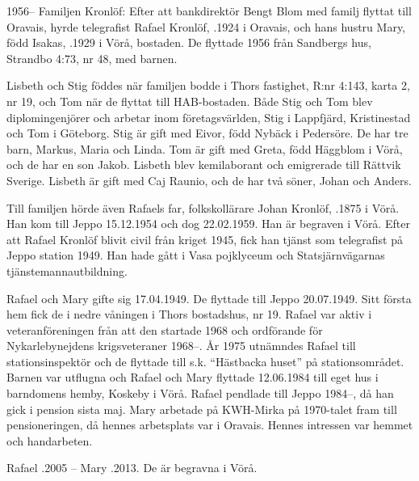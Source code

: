 1956--
Familjen Kronlöf:	Efter att bankdirektör Bengt Blom med familj flyttat till	Oravais, hyrde telegrafist Rafael Kronlöf, .1924 i Oravais, och hans hustru Mary, född Isakas, .1929 i Vörå, bostaden. De flyttade 1956 från Sandbergs hus, Strandbo 4:73, nr 48, med barnen.
\begin{jhchildren}
  \item {}
  \item {}
  \item {}
  \item {}
\end{jhchildren}
Lisbeth och Stig föddes när familjen bodde i Thors fastighet, R:nr 4:143, karta 2, nr 19, och Tom när de flyttat till HAB-bostaden. Både Stig och Tom blev diplomingenjörer och	arbetar inom företagsvärlden, Stig i Lappfjärd, Kristinestad 	och Tom i Göteborg. Stig är gift med Eivor, född Nybäck i Pedersöre. De har tre barn, Markus, Maria och Linda. Tom är gift med Greta, född Häggblom i Vörå, och de har en son Jakob. Lisbeth blev kemilaborant och emigrerade till Rättvik		Sverige. Lisbeth är gift med Caj Raunio, och de har två söner, Johan och Anders.

Till familjen hörde även Rafaels far, folkskollärare Johan Kronlöf, .1875 i Vörå. Han kom till Jeppo 		15.12.1954 och dog 22.02.1959. Han är begraven i Vörå. Efter att Rafael Kronlöf blivit civil från kriget 1945, fick han	tjänst som telegrafist på Jeppo station 1949. Han hade gått i	Vasa pojklyceum och Statsjärnvägarnas 			tjänstemannautbildning.

Rafael och Mary gifte sig 17.04.1949. De flyttade till Jeppo 20.07.1949. Sitt första hem fick de i nedre våningen i Thors bostadshus, nr 19.  Rafael var aktiv i veteranföreningen från att den startade 1968 och ordförande för Nykarlebynejdens krigsveteraner 1968--. År 1975 utnämndes Rafael till stationsinspektör och de flyttade till s.k. ``Hästbacka huset'' på stationsområdet. Barnen var utflugna och Rafael och Mary flyttade 12.06.1984	till eget hus i barndomens hemby, Koskeby i Vörå.	Rafael pendlade till Jeppo 1984--, då han gick i pension sista maj. Mary arbetade på KWH-Mirka på 1970-talet fram till pensioneringen, då hennes arbetsplats var i Oravais.  Hennes intressen var hemmet och handarbeten.

Rafael .2005  --  Mary .2013. De är begravna i Vörå.



